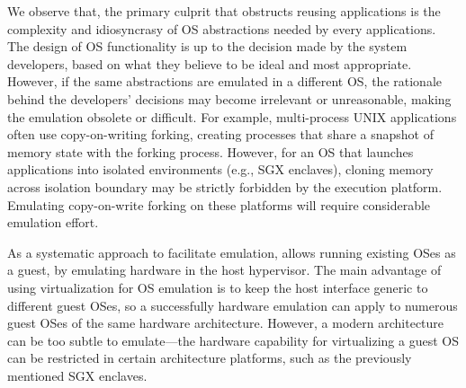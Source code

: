 We observe that, the primary culprit that obstructs reusing applications
is the complexity and idiosyncrasy of OS abstractions needed by every applications.
The design of OS functionality is up to the decision made by the system developers,
based on what they believe to be ideal and most appropriate.
However, if the same abstractions are emulated in a different OS,
the rationale behind the developers' decisions may become irrelevant or unreasonable,
making the emulation obsolete or difficult.
For example, multi-process UNIX applications often use copy-on-writing forking,
creating processes that share a snapshot of memory state with the forking process.
However, for an OS that launches applications into isolated environments (e.g., SGX enclaves),
cloning memory across isolation boundary
may be strictly forbidden by the execution platform.
Emulating copy-on-write forking on these platforms will require considerable emulation effort.





As a systematic approach to facilitate emulation,
 allows running existing OSes as a guest,
by emulating hardware in the host hypervisor.
The main advantage of using virtualization for OS emulation is to keep the host interface generic to different guest OSes,
so a successfully hardware emulation
can apply to numerous guest OSes of the same hardware architecture.
However, a modern architecture can be too subtle to emulate---the hardware capability for virtualizing a guest OS
can be restricted in certain architecture platforms,
such as the previously mentioned SGX enclaves.

